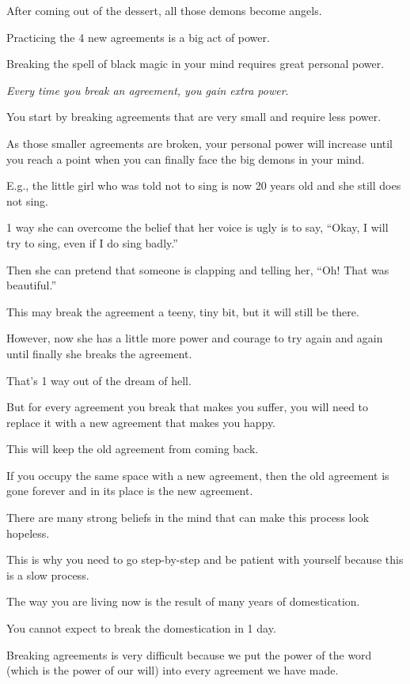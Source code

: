 \documentclass{article}
\numberwithin{equation}{section}
\begin{document}
After coming out of the dessert, all those demons become angels.

%
Practicing the 4 new agreements is a big act of power.

Breaking the spell of black magic in your mind requires great personal power.

\textit{Every time you break an agreement, you gain extra power}.

You start by breaking agreements that are very small and require less power.

As those smaller agreements are broken, your personal power will increase until you reach a point when you can finally face the big demons in your mind.

%
E.g., the little girl who was told not to sing is now 20 years old and she still does not sing.

1 way she can overcome the belief that her voice is ugly is to say, ``Okay, I will try to sing, even if I do sing badly.''

Then she can pretend that someone is clapping and telling her, ``Oh! That was beautiful.''

This may break the agreement a teeny, tiny bit, but it will still be there.

However, now she has a little more power and courage to try again and again until finally she breaks the agreement.

%
That's 1 way out of the dream of hell.

But for every agreement you break that makes you suffer, you will need to replace it with a new agreement that makes you happy.

This will keep the old agreement from coming back.

If you occupy the same space with a new agreement, then the old agreement is gone forever and in its place is the new agreement.

%
There are many strong beliefs in the mind that can make this process look hopeless.

This is why you need to go step-by-step and be patient with yourself because this is a slow process.

The way you are living now is the result of many years of domestication.

You cannot expect to break the domestication in 1 day.

Breaking agreements is very difficult because we put the power of the word (which is the power of our will) into every agreement we have made.
\end{document}
